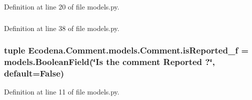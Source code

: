 Definition at line 20 of file models.py.

\hypertarget{class_ecodena_1_1_comment_1_1models_1_1_comment_aa690ec4009c2c1c783fdcd6d6ee29a6e}{
\subsubsection[{isReported\_\-f}]{}}
\label{d9/d86/class_ecodena_1_1_comment_1_1models_1_1_comment_aa690ec4009c2c1c783fdcd6d6ee29a6e}


Definition at line 38 of file models.py.

\hypertarget{class_ecodena_1_1_comment_1_1models_1_1_comment_ac146541041d0391dbe6820b161d3d467}{
\subsubsection[{isReported\_\-f}]{\setlength{\rightskip}{0pt plus 5cm}tuple {\bf Ecodena.Comment.models.Comment.isReported\_\-f} = models.BooleanField(\char`\"{}Is the comment Reported ?\char`\"{}, default=False)}}
\label{d9/d86/class_ecodena_1_1_comment_1_1models_1_1_comment_ac146541041d0391dbe6820b161d3d467}


Definition at line 11 of file models.py.

\hypertarget{class_ecodena_1_1_comment_1_1models_1_1_comment_a7185724458c06c0810da5aa79ddb222b}{
\subsubsection[{questionID\_\-f}]{}}
\label{d9/d86/class_ecodena_1_1_comment_1_1models_1_1_comment_a7185724458c06c0810da5aa79ddb222b}


